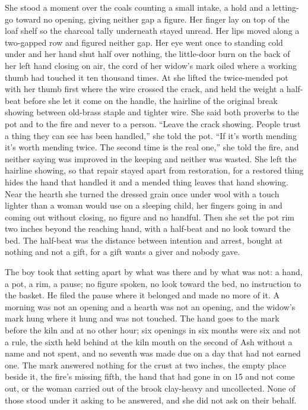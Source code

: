 She stood a moment over the coals counting a small intake, a hold and a letting-go toward no opening, giving neither gap a figure. Her finger lay on top of the loaf shelf so the charcoal tally underneath stayed unread. Her lips moved along a two-gapped row and figured neither gap. Her eye went once to  standing cold under  and her hand shut half over nothing, the little-door burn on the back of her left hand closing on air, the cord of her widow's mark oiled where a working thumb had touched it ten thousand times. At  she lifted the twice-mended pot with her thumb first where the wire crossed the crack, and held the weight a half-beat before she let it come on the handle, the hairline of the original break showing between old-brass staple and tighter wire. She said both proverbs to the pot and to the fire and never to a person. “Leave the crack showing. People trust a thing they can see has been handled,” she told the pot. “If it's worth mending it's worth mending twice. The second time is the real one,” she told the fire, and neither saying was improved in the keeping and neither was wasted. She left the hairline showing, so that repair stayed apart from restoration, for a restored thing hides the hand that handled it and a mended thing leaves that hand showing. Near the hearth she turned the dressed grain once under wool with a touch lighter than a woman would use on a sleeping child, her fingers going in and coming out without closing, no figure and no handful. Then she set the pot rim two inches beyond the reaching hand, with a half-beat and no look toward the bed. The half-beat was the distance between intention and arrest, bought at nothing and not a gift, for a gift wants a giver and nobody gave.

The boy took that setting apart by what was there and by what was not: a hand, a pot, a rim, a pause; no figure spoken, no look toward the bed, no instruction to the basket. He filed the pause where it belonged and made no more of it. A morning was not an opening and a hearth was not an opening, and the widow's mark hung where it hung and was not touched. The hand goes to the mark before the kiln and at no other hour; six openings in six months were six and not a rule, the sixth held behind at the kiln mouth on the second of Ash without a name and not spent, and no seventh was made due on a day that had not earned one. The mark answered nothing for the crust at two inches, the empty place beside it, the fire's missing fifth, the hand that had gone in on  15 and not come out, or the woman carried out of the brook clay-heavy and uncollected. None of those stood under it asking to be answered, and she did not ask on their behalf.

